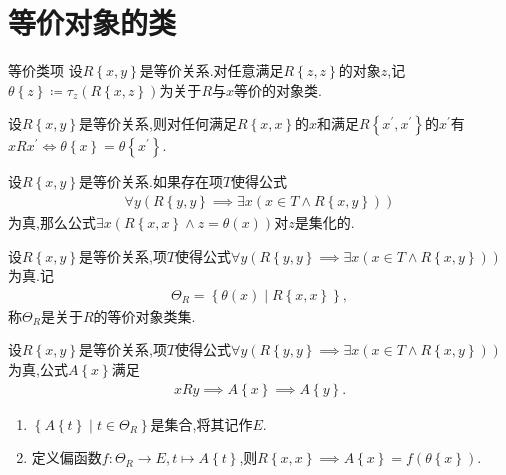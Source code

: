 \section{等价对象的类}

\begin{definition}{等价类项}{}
	设$R\left\{x,y\right\}$是等价关系.对任意满足$R\left\{z,z\right\}$的对象$z$,记$\theta\left\{z\right\}\coloneq\tau_{z}\left(R\left\{x,z\right\}\right)$为关于$R$与$x$等价的对象类.
\end{definition}

\begin{proposition}{}{}
	设$R\left\{x,y\right\}$是等价关系,则对任何满足$R\left\{x,x\right\}$的$x$和满足$R\left\{x^{\prime},x^{\prime}\right\}$的$x^{\prime}$有$xRx^{\prime}\iff\theta\left\{x\right\}=\theta\left\{x^{\prime}\right\}$.
\end{proposition}

\begin{proposition}{}{}
	设$R\left\{x,y\right\}$是等价关系.如果存在项$T$使得公式
	\begin{align*}
		\forall y\left(R\left\{y,y\right\}\implies\exists x\left(x\in T\wedge R\left\{x,y\right\}\right)\right)
	\end{align*}
	为真,那么公式$\exists x\left(R\left\{x,x\right\}\wedge z=\theta\left(x\right)\right)$对$z$是集化的.
\end{proposition}

\begin{definition}{}{}
	设$R\left\{x,y\right\}$是等价关系,项$T$使得公式$\forall y\left(R\left\{y,y\right\}\implies\exists x\left(x\in T\wedge R\left\{x,y\right\}\right)\right)$为真.记
	\begin{align*}
		\Theta_{R}=\left\{\theta\left(x\right)\middle|R\left\{x,x\right\}\right\},
	\end{align*}		
	称$\Theta_{R}$是关于$R$的等价对象类集.
\end{definition}

\begin{proposition}{}{}
	设$R\left\{x,y\right\}$是等价关系,项$T$使得公式$\forall y\left(R\left\{y,y\right\}\implies\exists x\left(x\in T\wedge R\left\{x,y\right\}\right)\right)$为真,公式$A\left\{x\right\}$满足
	\begin{align*}
		xRy\implies A\left\{x\right\}\implies A\left\{y\right\}.
	\end{align*}
	\begin{enumerate}
		\item $\left\{A\left\{t\right\}\middle|t\in\Theta_{R}\right\}$是集合,将其记作$E$.
		\item 定义偏函数$f:\Theta_{R}\to E,t\mapsto A\left\{t\right\}$,则$R\left\{x,x\right\}\implies A\left\{x\right\}=f\left(\theta\left\{x\right\}\right)$.
	\end{enumerate}
\end{proposition}

